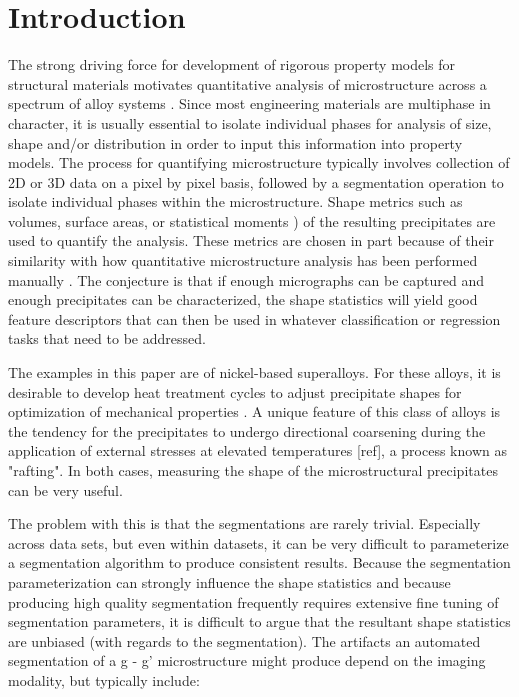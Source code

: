 \documentclass[review]{elsarticle}
\begin{document}
	\section{Introduction}
		The strong driving force for development of rigorous property models for structural materials motivates quantitative analysis of microstructure across a spectrum of alloy systems \cite{echlinlenthe}. Since most engineering materials are multiphase in character, it is usually essential to isolate individual phases for analysis of size, shape and/or distribution in order to input this information into property models. The process for quantifying microstructure typically involves collection of 2D or 3D data on a pixel by pixel basis, followed by a segmentation operation to isolate individual phases within the microstructure. Shape metrics such as volumes, surface areas, or statistical moments \cite{twoDM, threeDM}) of the resulting precipitates are used to quantify the analysis. These metrics are chosen in part because of their similarity with how quantitative microstructure analysis has been performed manually \cite{sluytman, underwood}. The conjecture is that if enough micrographs can be captured and enough precipitates can be characterized, the shape statistics will yield good feature descriptors that can then be used in whatever classification or regression tasks that need to be addressed.
		
		The examples in this paper are of nickel-based superalloys. For these alloys, it is desirable to develop heat treatment cycles to adjust precipitate shapes for optimization of mechanical properties \cite{sluytman}. A unique feature of this class of alloys is the tendency for the precipitates to undergo directional coarsening during the application of external stresses at elevated temperatures [ref], a process known as "rafting". In both cases, measuring the shape of the microstructural precipitates can be very useful.

		The problem with this is that the segmentations are rarely trivial. Especially across data sets, but even within datasets, it can be very difficult to parameterize a segmentation algorithm to produce consistent results. Because the segmentation parameterization can strongly influence the shape statistics and because producing high quality segmentation frequently requires extensive fine tuning of segmentation parameters, it is difficult to argue that the resultant shape statistics are unbiased (with regards to the segmentation). The artifacts an automated segmentation of a g - g' microstructure might produce depend on the imaging modality, but typically include:
\end{document}
